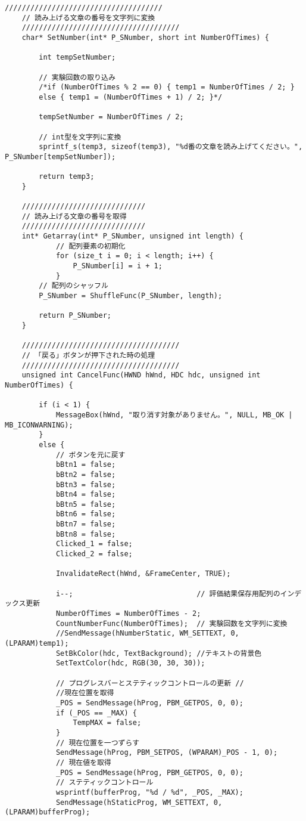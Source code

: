 \begin{lstlisting}[caption=main.cpp]
	/////////////////////////////////////
	// 読み上げる文章の番号を文字列に変換
	/////////////////////////////////////
	char* SetNumber(int* P_SNumber, short int NumberOfTimes) {
	
		int tempSetNumber;
		
		// 実験回数の取り込み
		/*if (NumberOfTimes % 2 == 0) { temp1 = NumberOfTimes / 2; }
		else { temp1 = (NumberOfTimes + 1) / 2; }*/
	
		tempSetNumber = NumberOfTimes / 2;
	
		// int型を文字列に変換
		sprintf_s(temp3, sizeof(temp3), "%d番の文章を読み上げてください。", P_SNumber[tempSetNumber]);
	
		return temp3;
	}
	
	/////////////////////////////
	// 読み上げる文章の番号を取得
	/////////////////////////////
	int* Getarray(int* P_SNumber, unsigned int length) {
			// 配列要素の初期化
			for (size_t i = 0; i < length; i++) {
				P_SNumber[i] = i + 1; 
			}
		// 配列のシャッフル
		P_SNumber = ShuffleFunc(P_SNumber, length);
	
		return P_SNumber;
	}
	
	/////////////////////////////////////
	// 「戻る」ボタンが押下された時の処理
	/////////////////////////////////////
	unsigned int CancelFunc(HWND hWnd, HDC hdc, unsigned int NumberOfTimes) {
	
		if (i < 1) {
			MessageBox(hWnd, "取り消す対象がありません。", NULL, MB_OK | MB_ICONWARNING);
		}
		else {
			// ボタンを元に戻す
			bBtn1 = false;
			bBtn2 = false;
			bBtn3 = false;
			bBtn4 = false;
			bBtn5 = false;
			bBtn6 = false;
			bBtn7 = false;
			bBtn8 = false;
			Clicked_1 = false;
			Clicked_2 = false;
	
			InvalidateRect(hWnd, &FrameCenter, TRUE);
	
			i--;                             // 評価結果保存用配列のインデックス更新
			NumberOfTimes = NumberOfTimes - 2;
			CountNumberFunc(NumberOfTimes);  // 実験回数を文字列に変換
			//SendMessage(hNumberStatic, WM_SETTEXT, 0, (LPARAM)temp1);
			SetBkColor(hdc, TextBackground); //テキストの背景色
			SetTextColor(hdc, RGB(30, 30, 30));
	
			// プログレスバーとステティックコントロールの更新 //
			//現在位置を取得
			_POS = SendMessage(hProg, PBM_GETPOS, 0, 0); 
			if (_POS == _MAX) {
				TempMAX = false;
			}
			// 現在位置を一つずらす
			SendMessage(hProg, PBM_SETPOS, (WPARAM)_POS - 1, 0);
			// 現在値を取得
			_POS = SendMessage(hProg, PBM_GETPOS, 0, 0);
			// ステティックコントロール
			wsprintf(bufferProg, "%d / %d", _POS, _MAX);
			SendMessage(hStaticProg, WM_SETTEXT, 0, (LPARAM)bufferProg);
	

\end{lstlisting}
